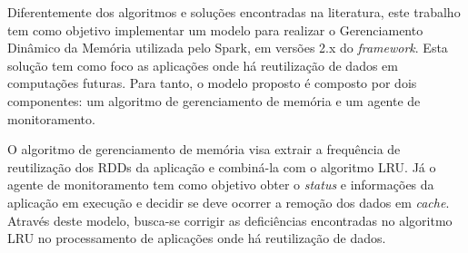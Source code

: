 Diferentemente dos algoritmos e soluções encontradas na literatura, este trabalho tem como objetivo implementar um modelo para realizar o Gerenciamento Dinâmico da Memória utilizada pelo Spark, em versões 2.x do \textit{framework}. Esta solução tem como foco as aplicações onde há reutilização de dados em computações futuras. Para tanto, o modelo proposto é composto por dois componentes: um algoritmo de gerenciamento de memória e um agente de monitoramento.

O algoritmo de gerenciamento de memória visa extrair a frequência de reutilização dos RDDs da aplicação e combiná-la com o algoritmo LRU. Já o agente de monitoramento tem como objetivo obter o \textit{status} e informações da aplicação em execução e decidir se deve ocorrer a remoção dos dados em \textit{cache}. Através deste modelo, busca-se corrigir as deficiências encontradas no algoritmo LRU no processamento de aplicações onde há reutilização de dados.